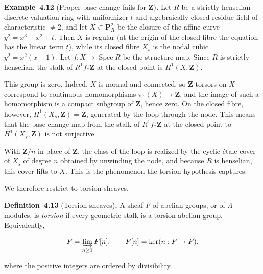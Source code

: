 \documentclass[11pt]{article}
\newenvironment{bpstatement}[2]{\par\addvspace{0.6\baselineskip}\noindent\textbf{#1}#2\textbf{.}\enspace\ignorespaces}
  {\par\addvspace{0.4\baselineskip}}
\begin{document}
\label{bp318}%
\begin{bpstatement}{Example~4.12}{ (Proper base change fails for $\mathbf Z$)}
Let \(R\) be a strictly henselian discrete valuation ring with uniformizer \(t\) and algebraically closed residue field of characteristic \(\neq2\), and let \(X\subset\mathbf P^2_R\) be the closure of the affine curve \(y^2=x^3-x^2+t\). Then \(X\) is regular (at the origin of the closed fibre the equation has the linear term \(t\)), while its closed fibre \(X_s\) is the nodal cubic \(y^2=x^2(x-1)\). Let \(f:X\to\operatorname{Spec}R\) be the structure map. Since \(R\) is strictly henselian, the stalk of \(R^1f_*\mathbf Z\) at the closed point is \(H^1(X,\mathbf Z)\).

This group is zero. Indeed, \(X\) is normal and connected, so \(\mathbf Z\)-torsors on \(X\) correspond to continuous homomorphisms \(\pi_1(X)\to\mathbf Z\), and the image of such a homomorphism is a compact subgroup of \(\mathbf Z\), hence zero. On the closed fibre, however, \(H^1(X_s,\mathbf Z)=\mathbf Z\), generated by the loop through the node. This means that the base change map from the stalk of \(R^1f_*\mathbf Z\) at the closed point to \(H^1(X_s,\mathbf Z)\) is not surjective.

With \(\mathbf Z/n\) in place of \(\mathbf Z\), the class of the loop is realized by the cyclic étale cover of \(X_s\) of degree \(n\) obtained by unwinding the node, and because \(R\) is henselian, this cover lifts to \(X\). This is the phenomenon the torsion hypothesis captures.
\end{bpstatement}

\label{bp319}%
We therefore restrict to torsion sheaves.

\label{bp320}%
\begin{bpstatement}{Definition~4.13}{ (Torsion sheaves)}
A sheaf \(F\) of abelian groups, or of \(\Lambda\)-modules, is \emph{torsion} if every geometric stalk is a torsion abelian group. Equivalently,

\[
F=\varinjlim_{n\geq1}F[n],\qquad F[n]=\ker(n:F\to F),
\]

where the positive integers are ordered by divisibility.
\end{bpstatement}
\end{document}

